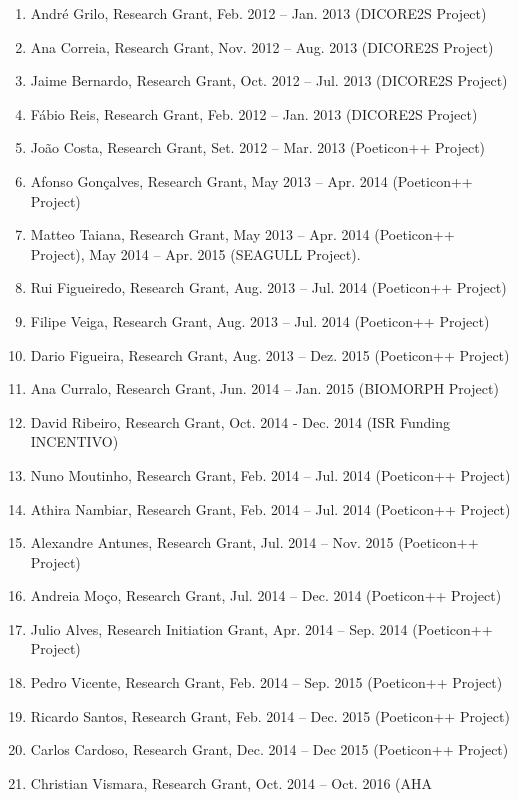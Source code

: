 \documentclass[
]{article}
\begin{document}
\begin{enumerate}
\item
  André Grilo, Research Grant, Feb. 2012 -- Jan. 2013 (DICORE2S Project)
\item
  Ana Correia, Research Grant, Nov. 2012 -- Aug. 2013 (DICORE2S Project)
\item
  Jaime Bernardo, Research Grant, Oct. 2012 -- Jul. 2013 (DICORE2S
  Project)
\item
  Fábio Reis, Research Grant, Feb. 2012 -- Jan. 2013 (DICORE2S Project)
\item
  João Costa, Research Grant, Set. 2012 -- Mar. 2013 (Poeticon++
  Project)
\item
  Afonso Gonçalves, Research Grant, May 2013 -- Apr. 2014 (Poeticon++
  Project)
\item
  Matteo Taiana, Research Grant, May 2013 -- Apr. 2014 (Poeticon++
  Project), May 2014 -- Apr. 2015 (SEAGULL Project).
\item
  Rui Figueiredo, Research Grant, Aug. 2013 -- Jul. 2014 (Poeticon++
  Project)
\item
  Filipe Veiga, Research Grant, Aug. 2013 -- Jul. 2014 (Poeticon++
  Project)
\item
  Dario Figueira, Research Grant, Aug. 2013 -- Dez. 2015 (Poeticon++
  Project)
\item
  Ana Curralo, Research Grant, Jun. 2014 -- Jan. 2015 (BIOMORPH Project)
\item
  David Ribeiro, Research Grant, Oct. 2014 - Dec. 2014 (ISR Funding
  INCENTIVO)
\item
  Nuno Moutinho, Research Grant, Feb. 2014 -- Jul. 2014 (Poeticon++
  Project)
\item
  Athira Nambiar, Research Grant, Feb. 2014 -- Jul. 2014 (Poeticon++
  Project)
\item
  Alexandre Antunes, Research Grant, Jul. 2014 -- Nov. 2015 (Poeticon++
  Project)
\item
  Andreia Moço, Research Grant, Jul. 2014 -- Dec. 2014 (Poeticon++
  Project)
\item
  Julio Alves, Research Initiation Grant, Apr. 2014 -- Sep. 2014
  (Poeticon++ Project)
\item
  Pedro Vicente, Research Grant, Feb. 2014 -- Sep. 2015 (Poeticon++
  Project)
\item
  Ricardo Santos, Research Grant, Feb. 2014 -- Dec. 2015 (Poeticon++
  Project)
\item
  Carlos Cardoso, Research Grant, Dec. 2014 -- Dec 2015 (Poeticon++
  Project)
\item
  Christian Vismara, Research Grant, Oct. 2014 -- Oct. 2016 (AHA

\end{enumerate}
\end{document}
